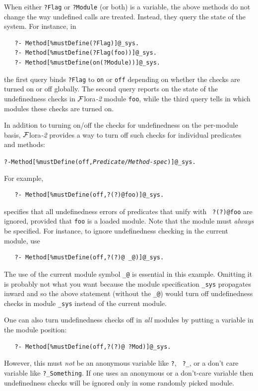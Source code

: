 \documentclass[11pt]{article}
\newcommand{\FLORA}{{\mbox{\sc ${\cal F}${lora}\rm\emph{-2}}}\xspace}
\begin{document}
When either {\tt ?Flag} or {\tt ?Module} (or both) is a variable, the above
methods do not change the way undefined calls are treated. Instead, they
query the state of the system. For instance, in
\begin{verbatim}
   ?- Method[%mustDefine(?Flag)]@_sys.
   ?- Method[%mustDefine(?Flag(foo))]@_sys.
   ?- Method[%mustDefine(on(?Module))]@_sys.
\end{verbatim}
the first query binds {\tt ?Flag} to {\tt on} or {\tt off} depending on
whether the checks are turned on or off globally. The second query reports
on the state of the undefinedness checks in \FLORA module {\tt foo}, while
the third query tells in which modules these checks are turned on.

In addition to turning on/off the checks for undefinedness on the per-module
basis, \FLORA provides a way to turn off such checks for individual
predicates and methods:
\begin{alltt}
   ?- Method[\%mustDefine(off,\mbox{\rm\emph{Predicate/Method-spec}})]@_sys.
\end{alltt}
For example, 
\begin{verbatim}
   ?- Method[%mustDefine(off,?(?)@foo)]@_sys.
\end{verbatim}
specifies that all undefinedness errors of predicates that unify with {\tt
  ?(?)@foo} are ignored, provided that {\tt foo} is a loaded module. Note
that the module must \emph{always} be specified. For instance, to ignore
undefinedness checking in the current module, use
\begin{verbatim}
   ?- Method[%mustDefine(off,?(?)@ _@)]@_sys.
\end{verbatim}
The use of the current module symbol {\tt \_@} is essential in
this example. Omitting it is probably not what you want because
the module specification {\tt \_sys} propagates inward and so the above
statement (without the {\tt \_@}) would turn off undefinedness checks in
module {\tt \_sys} instead of the current module.

One can also turn undefinedness checks off in \emph{all} modules by putting a
variable in the module position:
\begin{verbatim}
   ?- Method[%mustDefine(off,?(?)@ ?Mod)]@_sys.
\end{verbatim}
However, this must \emph{not} be an anonymous variable like {\tt ?}, {\tt
  ?\_}, or a don't care variable like {\tt ?\_Something}.  If one uses an
anonymous or a don't-care variable then undefinedness checks will be ignored
only in some randomly picked module.
\end{document}
